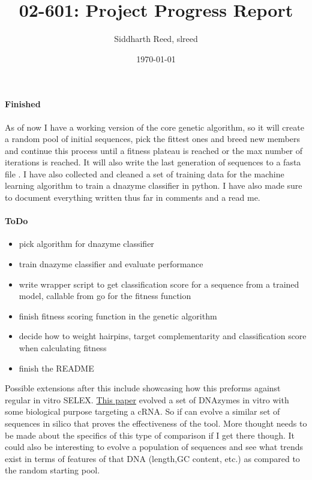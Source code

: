 \documentclass[11pt]{article}
\begin{document}
\title{02-601: Project Progress Report}
\author{Siddharth Reed, slreed}
\date{\today}
\maketitle

\paragraph{\textbf{Finished}}

As of now I have a working version of the core genetic algorithm, so it will create a random pool of initial sequences, pick the fittest ones and breed new members and continue this process until a fitness plateau is reached or the max number of iterations is reached.
It will also write the last generation of sequences to a fasta file .
I have also collected and cleaned a set of training data for the machine learning algorithm to train a dnazyme classifier in python.
I have also made sure to document everything written thus far in comments and a read me.
\par
\paragraph{\textbf{ToDo}}
\begin{itemize}
    \item pick algorithm for dnazyme classifier
    \item train dnazyme classifier and evaluate performance
    \item write wrapper script to get classification score for a sequence from a trained model, callable from go for the fitness function
    \item finish fitness scoring function in the genetic algorithm
    \item decide how to weight hairpins, target complementarity and classification score when calculating fitness
    \item finish the README
\end{itemize}
Possible extensions after this include showcasing how this preforms against regular in vitro SELEX.
\href{https://www.ncbi.nlm.nih.gov/pmc/articles/PMC2737201/}{This paper} evolved a set of DNAzymes in vitro with some biological purpose targeting a cRNA.
So if can evolve a similar set of sequences in silico that proves the effectiveness of the tool.
More thought needs to be made about the specifics of this type of comparison if I get there though.
It could also be interesting to evolve a population of sequences and see what trends exist in terms of features of that DNA (length,GC content, etc.) as compared to the random starting pool.
\par
\end{document}
